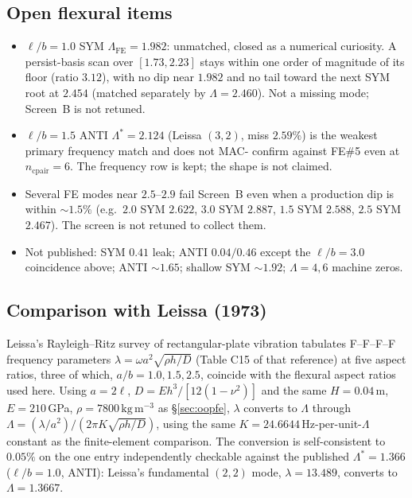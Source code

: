 \documentclass[11pt]{article}
\begin{document}
\subsection{Open flexural items}\label{sec:oop-open}
\begin{itemize}\itemsep2pt
\item $\ell/b=1.0$ SYM $\Lambda_{\mathrm{FE}}=1.982$: unmatched, closed as
a numerical curiosity. A persist-basis scan over $[1.73,2.23]$ stays
within one order of magnitude of its floor (ratio $3.12$), with no dip
near $1.982$ and no tail toward the next SYM root at $2.454$ (matched
separately by $\Lambda=2.460$). Not a missing mode; Screen~B is not
retuned.
\item $\ell/b=1.5$ ANTI $\Lambda^{*}=2.124$ (Leissa $(3,2)$, miss
$2.59\%$) is the weakest primary frequency match and does not MAC-
confirm against FE\#5 even at $n_{\mathrm{cpair}}=6$. The frequency
row is kept; the shape is not claimed.
\item Several FE modes near $2.5$--$2.9$ fail Screen~B even when a
production dip is within ${\sim}1.5\%$ (e.g.\ $2.0$ SYM $2.622$, $3.0$
SYM $2.887$, $1.5$ SYM $2.588$, $2.5$ SYM $2.467$). The screen is not
retuned to collect them.
\item Not published: SYM $0.41$ leak; ANTI $0.04/0.46$ except the
$\ell/b=3.0$ coincidence above; ANTI ${\sim}1.65$; shallow SYM
${\sim}1.92$; $\Lambda=4,6$ machine zeros.
\end{itemize}

\subsection{Comparison with Leissa (1973)}\label{sec:leissa}
Leissa's Rayleigh--Ritz survey of rectangular-plate vibration \cite{leissa1973}
tabulates F--F--F--F frequency parameters $\lambda=\omega a^2\sqrt{\rho h/D}$
(Table C15 of that reference) at five aspect ratios, three of which,
$a/b=1.0,1.5,2.5$, coincide with the flexural aspect ratios used here. Using
$a=2\ell$, $D=Eh^3/[12(1-\nu^2)]$ and the same $H=0.04\,$m, $E=210\,$GPa,
$\rho=7800\,\mathrm{kg\,m^{-3}}$ as \S\ref{sec:oopfe}, $\lambda$ converts to
$\Lambda$ through $\Lambda = (\lambda/a^2)/(2\pi K\sqrt{\rho h/D})$, using the
same $K=24.6644\,$Hz-per-unit-$\Lambda$ constant as the finite-element
comparison. The conversion is self-consistent to $0.05\%$ on the one entry
independently checkable against the published $\Lambda^{*}=1.366$
($\ell/b=1.0$, ANTI): Leissa's fundamental $(2,2)$ mode,
$\lambda=13.489$, converts to $\Lambda=1.3667$.
\end{document}
